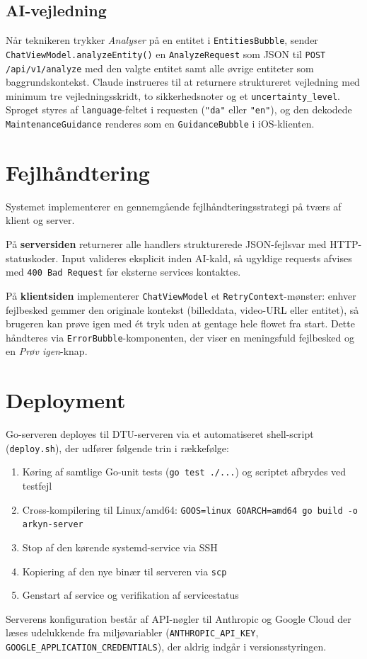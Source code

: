 \subsection{AI-vejledning}

Når teknikeren trykker \textit{Analyser} på en entitet i \texttt{EntitiesBubble}, sender \texttt{ChatViewModel.analyzeEntity()} en \texttt{AnalyzeRequest} som JSON til \texttt{POST /api/v1/analyze} med den valgte entitet samt alle øvrige entiteter som baggrundskontekst. Claude instrueres til at returnere struktureret vejledning med minimum tre vejledningsskridt, to sikkerhedsnoter og et \texttt{uncertainty\_level}. Sproget styres af \texttt{language}-feltet i requesten (\texttt{"da"} eller \texttt{"en"}), og den dekodede \texttt{MaintenanceGuidance} renderes som en \texttt{GuidanceBubble} i iOS-klienten.

\section{Fejlhåndtering}
\label{sec:fejlhaandtering}

Systemet implementerer en gennemgående fejlhåndteringsstrategi på tværs af klient og server.

På \textbf{serversiden} returnerer alle handlers strukturerede JSON-fejlsvar med HTTP-statuskoder. Input valideres eksplicit inden AI-kald, så ugyldige requests afvises med \texttt{400 Bad Request} før eksterne services kontaktes.

På \textbf{klientsiden} implementerer \texttt{ChatViewModel} et \texttt{RetryContext}-mønster: enhver fejlbesked gemmer den originale kontekst (billeddata, video-URL eller entitet), så brugeren kan prøve igen med ét tryk uden at gentage hele flowet fra start. Dette håndteres via \texttt{ErrorBubble}-komponenten, der viser en meningsfuld fejlbesked og en \textit{Prøv igen}-knap.

\section{Deployment}
\label{sec:deployment}

Go-serveren deployes til DTU-serveren via et automatiseret shell-script (\texttt{deploy.sh}), der udfører følgende trin i rækkefølge:

\begin{enumerate}
  \item Køring af samtlige Go-unit tests (\texttt{go test ./...}) og scriptet afbrydes ved testfejl
  \item Cross-kompilering til Linux/amd64: \texttt{GOOS=linux GOARCH=amd64 go build -o arkyn-server}
  \item Stop af den kørende systemd-service via SSH
  \item Kopiering af den nye binær til serveren via \texttt{scp}
  \item Genstart af service og verifikation af servicestatus
\end{enumerate}

Serverens konfiguration består af API-nøgler til Anthropic og Google Cloud der læses udelukkende fra miljøvariabler (\texttt{ANTHROPIC\_API\_KEY}, \texttt{GOOGLE\_APPLICATION\_CREDENTIALS}), der aldrig indgår i versionsstyringen.
